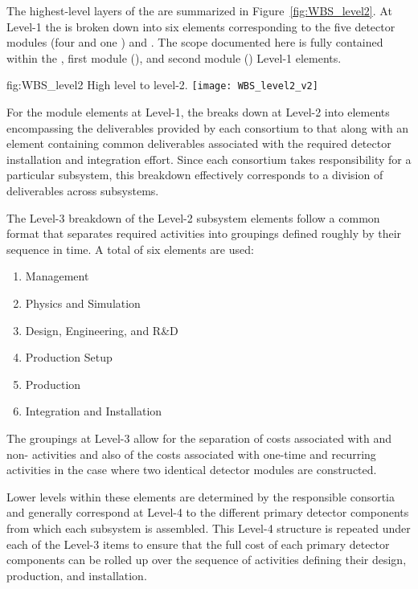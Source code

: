 The highest-level layers of the   are summarized 
in Figure~\ref{fig:WBS_level2}.  At Level-1 the  is broken down into 
six elements corresponding to the five  detector modules (four 
 and one ) and .  The scope documented
here is fully contained within the , first  module 
(), and second  module () Level-1 elements.   
\begin{dunefigure}{fig:WBS_level2}
  {High level   to level-2.}
  \texttt{[image: WBS\_level2\_v2]}
\end{dunefigure}

For the  module elements at Level-1, the  breaks 
down at Level-2 into elements encompassing the deliverables provided by 
each consortium to that  along with an element containing 
common deliverables associated with the required detector installation 
and integration effort.  Since each consortium takes responsibility 
for a particular subsystem, this breakdown effectively corresponds to 
a division of deliverables across subsystems. 

The Level-3 breakdown of the Level-2 subsystem  elements follow 
a common format that separates required activities into groupings defined 
roughly by their sequence in time.  A total of six elements are used:     
\begin{enumerate}
  \item Management
  \item Physics and Simulation
  \item Design, Engineering, and R\&D
  \item Production Setup
  \item Production
  \item Integration and Installation
\end{enumerate}
The groupings at Level-3 allow for the separation of costs associated
with  and non- activities and also of the
costs associated with one-time and recurring activities in the case
where two identical detector modules are constructed.

Lower levels within these  elements are determined by 
the responsible consortia and generally correspond at Level-4 to 
the different primary detector components from which each subsystem
is assembled.  This Level-4 structure is repeated under each of the 
Level-3 items to ensure that the full cost of each primary detector 
components can be rolled up over the sequence of activities defining 
their design, production, and installation.       

